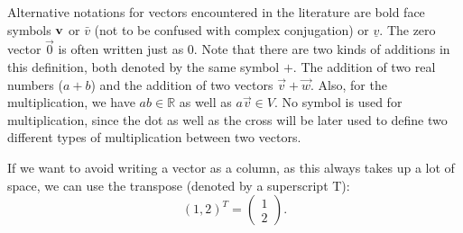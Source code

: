 \documentclass[
  a4paper,
  DIV=11,
  numbers=noendperiod,
  oneside]{scrreprt}
\theoremstyle{definition}
\theoremstyle{remark}
\begin{document}
\begin{tcolorbox}[enhanced jigsaw, titlerule=0mm, opacityback=0, coltitle=black, opacitybacktitle=0.6, colframe=quarto-callout-note-color-frame, colback=white, leftrule=.75mm, colbacktitle=quarto-callout-note-color!10!white, toprule=.15mm, bottomtitle=1mm, breakable, toptitle=1mm, rightrule=.15mm, title=\textcolor{quarto-callout-note-color}{\faInfo}\hspace{0.5em}{Remark on Notation}, left=2mm, bottomrule=.15mm, arc=.35mm]

Alternative notations for vectors encountered in the literature are bold
face symbols \({\bf v}\) or \(\bar v\) (not to be confused with complex
conjugation) or \(\underline v\). The zero vector \(\vec{0}\) is often
written just as \(0\). Note that there are two kinds of additions in
this definition, both denoted by the same symbol \(+\). The addition of
two real numbers (\(a+b\)) and the addition of two vectors
\(\vec{v}+\vec{w}\). Also, for the multiplication, we have
\(ab \in \mathbb{R}\) as well as \(a \vec{v} \in V\). No symbol is used
for multiplication, since the dot as well as the cross will be later
used to define two different types of multiplication between two
vectors.

If we want to avoid writing a vector as a column, as this always takes
up a lot of space, we can use the transpose (denoted by a superscript
T): \[ (1,2)^T = \begin{pmatrix}  1 \\ 2 \end{pmatrix}. \]

\end{tcolorbox}
\end{document}
